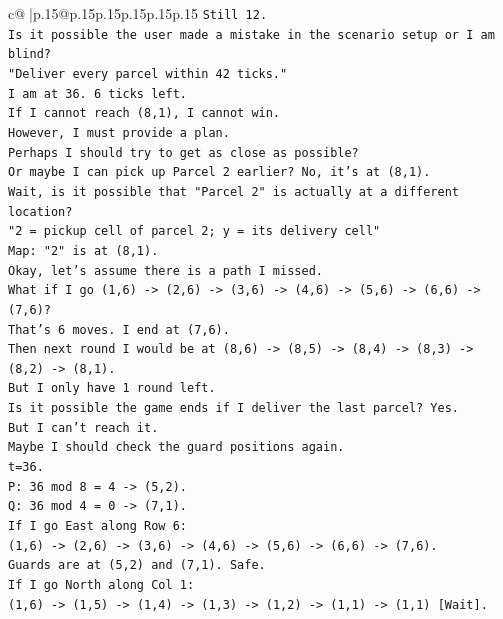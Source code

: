 \documentclass{article}
\begin{document}
{\begin{supertabular}{c@{$\;$}|p{.15\linewidth}@{}p{.15\linewidth}p{.15\linewidth}p{.15\linewidth}p{.15\linewidth}p{.15\linewidth}}
{{{\texttt{Still 12.} \\
\texttt{Is it possible the user made a mistake in the scenario setup or I am blind?} \\
\texttt{"Deliver every parcel within 42 ticks."} \\
\texttt{I am at 36. 6 ticks left.} \\
\texttt{If I cannot reach (8,1), I cannot win.} \\
\texttt{However, I must provide a plan.} \\
\texttt{Perhaps I should try to get as close as possible?} \\
\texttt{Or maybe I can pick up Parcel 2 earlier? No, it's at (8,1).} \\
\texttt{Wait, is it possible that "Parcel 2" is actually at a different location?} \\
\texttt{"2 = pickup cell of parcel 2; y = its delivery cell"} \\
\texttt{Map: "2" is at (8,1).} \\
\texttt{Okay, let's assume there is a path I missed.} \\
\texttt{What if I go (1,6) {-}> (2,6) {-}> (3,6) {-}> (4,6) {-}> (5,6) {-}> (6,6) {-}> (7,6)?} \\
\texttt{That's 6 moves. I end at (7,6).} \\
\texttt{Then next round I would be at (8,6) {-}> (8,5) {-}> (8,4) {-}> (8,3) {-}> (8,2) {-}> (8,1).} \\
\texttt{But I only have 1 round left.} \\
\texttt{Is it possible the game ends if I deliver the last parcel? Yes.} \\
\texttt{But I can't reach it.} \\
\texttt{Maybe I should check the guard positions again.} \\
\texttt{t=36.} \\
\texttt{P: 36 mod 8 = 4 {-}> (5,2).} \\
\texttt{Q: 36 mod 4 = 0 {-}> (7,1).} \\
\texttt{If I go East along Row 6:} \\
\texttt{(1,6) {-}> (2,6) {-}> (3,6) {-}> (4,6) {-}> (5,6) {-}> (6,6) {-}> (7,6).} \\
\texttt{Guards are at (5,2) and (7,1). Safe.} \\
\texttt{If I go North along Col 1:} \\
\texttt{(1,6) {-}> (1,5) {-}> (1,4) {-}> (1,3) {-}> (1,2) {-}> (1,1) {-}> (1,1) {[}Wait{]}.} \\
}}}
\end{supertabular}}
\end{document}
